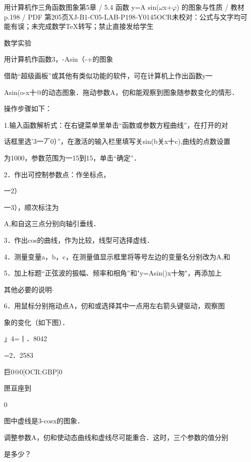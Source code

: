 \begin{bankitem}{用计算机作三角函数图象}{第5章 / 5.4 函数 y=A sin(\ensuremath{\omega}x+\ensuremath{\varphi}) 的图象与性质 / 教材 p.198 / PDF 第205页}{XJ-B1-C05-LAB-P198-Y0145}{OCR未校对：公式与文字均可能有误；未完成数学TeX转写；禁止直接发给学生}
\begin{ocrdraft}
\par
数学实验
\par
用计算机作函数3，-Asin（-+的图象
\par
借助“超级画板”或其他有类似功能的软件，可在计算机上作出函数y一
\par
Asin(o-x十@的动态图象．拖动参数A，仞和能观察到图象随参数变化的情形．
\par
操作步骤如下：
\par
1.输入函数解析式：在右键菜单里单击“函数或参数方程曲线”，在打开的对
\par
话框里选'3一丆0）”，在激活的输入栏里填写关sin(b关x十c),曲线的点数设置
\par
为1000，参数范围为一15到15，单击“确定”．
\par
2．作出可控制参数点：作坐标点，
\par
一2）
\par
一3），顺次标注为
\par
A,和自这三点分别向轴引垂线．
\par
3．作出cos的曲线，作为比较，线型可选择虚线．
\par
4．测量变量a，b，c，在测量值显示框里将等号左边的变量名分别改为A,和
\par
5．加上标题“正弦波的振幅、频率和相角”和"y=Asin()x十匆"，再添加上
\par
其他必要的说明\ensuremath{\cdot}
\par
6．用鼠标分别拖动点A，仞和或选择其中一点用左右箭头键驱动，观察图
\par
象的变化（如下图）．
\par
」4=丨．8042
\par
=2．2583
\par
巨0@0\ensuremath{\text{[OCR:GBP]}}0
\par
匣亘座到
\par
0
\par
图中虚线是3-cosx的图象．
\par
调整参数A，仞和使动态曲线和虚线尽可能重合．这时，三个参数的值分别
\par
是多少？
\end{ocrdraft}
\end{bankitem}
